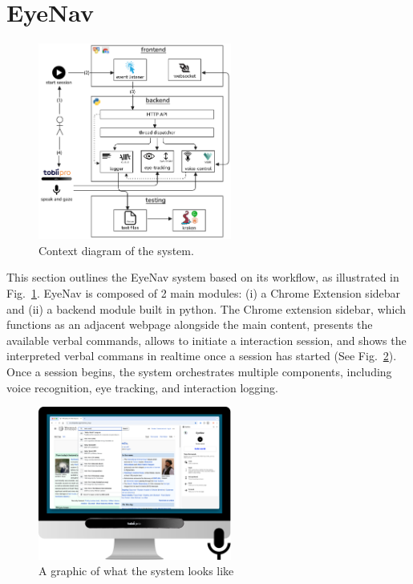 
\section{EyeNav}

\begin{figure}[h]
	\centering
	\vspace{-10pt}
	\includegraphics[width=180pt]{imgs/diagram-context.png}
	\caption{Context diagram of the system.}
	\label{fig:context}
\end{figure}

This section outlines the EyeNav system based on its workflow, as illustrated in Fig.~\ref{fig:context}. EyeNav is composed of 2 main modules: (i) a Chrome Extension sidebar and (ii) a backend module built in python. The Chrome extension sidebar, which functions as an adjacent webpage alongside the main content, presents the available verbal commands, allows to initiate a interaction session, and shows the interpreted verbal commans in realtime once a session has started (See Fig.~\ref{fig:requirements}). Once a session begins, the system orchestrates multiple components, including voice recognition, eye tracking, and interaction logging.

\begin{figure}[h]
	\centering
	\includegraphics[width=180pt]{imgs/system-requirements.png}
	\caption{A graphic of what the system looks like}
	\label{fig:requirements}
\end{figure}

